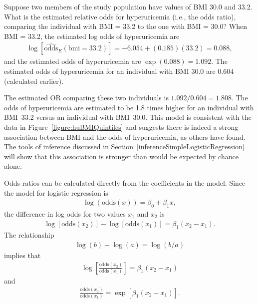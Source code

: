 \begin{examplewrap}
\begin{nexample}{Suppose two members of the study population have values of BMI 30.0 and 33.2. What is the estimated relative odds for hyperuricemia (i.e., the odds ratio), comparing the individual with BMI = 33.2 to the one with BMI = 30.0?}\label{example:ORHyperuricemia33v30}
When BMI = 33.2, the estimated log odds of hyperuricemia are
\begin{align*}
  \log[\widehat{\text{odds}}_E(\text{bmi} = 33.2)] = -6.054 + (0.185)(33.2) = 0.088,
\end{align*}
and the estimated odds of hyperuricemia are $\exp(0.088) = 1.092$. The estimated odds of hyperuricemia for an individual with BMI $30.0$ are $0.604$ (calculated earlier).

The estimated OR comparing these two individuals is $1.092/0.604 = 1.808$.  The odds of hyperuricemia are estimated to be 1.8 times higher for an individual with BMI~33.2 versus an individual with BMI~30.0.  This model is consistent with the data in Figure~\ref{figure:huBMIQuintiles} and suggests there is indeed a strong association between BMI and the odds of hyperuricemia, as others have found.  The tools of inference discussed in Section~\ref{inferenceSimpleLogisticRegression} will show that this association is stronger than would be expected by chance alone.
  \end{nexample}
\end{examplewrap}

Odds ratios can be calculated directly from the coefficients in the model. Since the model for logistic regression is
\begin{align*}
  \log(\text{odds}(x)) = \beta_0 + \beta_1 x,
\end{align*}
the difference in log odds for two values $x_1$ and $x_2$ is
\begin{align*}
  \log[\text{odds}(x_2)] - \log[\text{odds}(x_1)] = \beta_1(x_2 - x_1).
\end{align*}
The relationship
\begin{align*}
  \log(b) - \log(a) = \log(b/a)
\end{align*}
implies that
\begin{align*}
  \log\left[\frac{\text{odds}(x_2)}{\text{odds}(x_1)}\right] = \beta_1(x_2 - x_1)
\end{align*}
and
\begin{align}
  \frac{\text{odds}(x_2)}{\text{odds}(x_1)} = \exp[\beta_1(x_2 - x_1)].
  \label{eqn:oddsRatioLogisticRegression}
\end{align}

